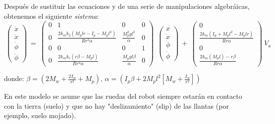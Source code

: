 \documentclass[10pt]{article}
\begin{document}
\vspace{2 mm}
Después de sustituir las ecuaciones y de una serie de manipulaciones algebráicas, obtenemos el siguiente \emph{sistema}:
\vspace{2 mm}
\begin{equation}
\  \left( \begin{array}{c}
\dot{x} \\
\ddot{x}\\
\dot{\phi} \\
\ddot{\phi} \end{array} \right) \   =
\  \left( \begin{array}{cccc}
0 & 1 & 0 & 0\\
0 & \frac{2k_{m}k_{2}(M_{p}lr - I_{p} - M_{p}l^2)}{Rr^2\alpha} & \frac{M_{p}^2gl^2}{\alpha} & 0\\
0 & 0 & 0 & 1 \\
0 & \frac{2k_{m}k_{e}(r\beta - M_{p}l)}{Rr^2\alpha} & \frac{M_{p}gl\beta}{\alpha} & 0 \end{array} \right) \ 
\  \left( \begin{array}{c}
x \\
\dot{x}\\
\phi \\
\dot{\phi}\end{array} \right) \ 
+
\  \left( \begin{array}{c}
0 \\
\frac{2k_{m}(I_{p} + M_{p}l^2 - M_{p}lr)}{Rr\alpha}\\
0\\
\frac{2k_{m}(M_{p}l) - r\beta}{Rr\alpha} \end{array} \right) \ V_{a}
\end{equation}

\vspace{2 mm}
donde:
$\beta = (2M_{w} + \frac{2I_{w}}{r^2} + M_{p})$,   
\hspace{4 mm}
$\alpha = (I_{p}\beta + 2M_{p}l^2[M_{w} + \frac{I_{w}}{r^2}])$

\vspace{2 mm}
En este modelo se asume que las ruedas del robot siempre estarán en contacto con la tierra (suelo) y que no hay "deslizamiento" (slip) de las llantas (por ejemplo, suelo mojado).
\end{document}
